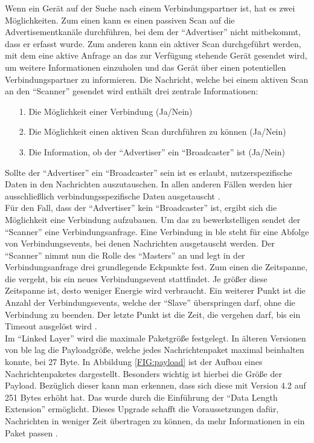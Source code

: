 \noindent Wenn ein Gerät auf der Suche nach einem Verbindungspartner ist, hat es zwei Möglichkeiten. Zum einen kann es einen passiven Scan auf die Advertisementkanäle durchführen, bei dem der "`Advertiser"' nicht mitbekommt, dass er erfasst wurde. Zum anderen kann ein aktiver Scan durchgeführt werden, mit dem eine aktive Anfrage an das zur Verfügung stehende Gerät gesendet wird, um weitere Informationen einzuholen und das Gerät über einen potentiellen Verbindungspartner zu informieren. Die Nachricht, welche bei einem aktiven Scan an den "`Scanner"' gesendet wird enthält drei zentrale Informationen:
\begin{itemize}
	\item[1.]{Die Möglichkeit einer Verbindung (Ja/Nein)}
	\item[2.]{Die Möglichkeit einen aktiven Scan durchführen zu können (Ja/Nein)}
	\item[3.]{Die Information, ob der "`Advertiser"' ein "`Broadcaster"' ist (Ja/Nein)}
\end{itemize}           
Sollte der "`Advertiser"' ein "`Broadcaster"' sein ist es erlaubt, nutzerspezifische Daten in den Nachrichten auszutauschen. In allen anderen Fällen werden hier ausschließlich verbindungsspezifische Daten ausgetauscht \cite[Seite 20f]{Townsend14:GSB}.\\

\noindent Für den Fall, dass der "`Advertiser"' kein "`Broadcaster"' ist, ergibt sich die Möglichkeit eine Verbindung aufzubauen. Um das zu bewerkstelligen sendet der "`Scanner"' eine Verbindungsanfrage. Eine Verbindung in \ac{ble} steht für eine Abfolge von Verbindungsevents, bei denen Nachrichten ausgetauscht werden. Der "`Scanner"' nimmt nun die Rolle des "`Masters"' an und legt in der Verbindungsanfrage drei grundlegende Eckpunkte fest. Zum einen die Zeitspanne, die vergeht, bis ein neues Verbindungsevent stattfindet. Je größer diese Zeitspanne ist, desto weniger Energie wird verbraucht. Ein weiterer Punkt ist die Anzahl der Verbindungsevents, welche der "`Slave"' überspringen darf, ohne die Verbindung zu beenden. Der letzte Punkt ist die Zeit, die vergehen darf, bis ein Timeout ausgelöst wird \cite[Seite 21f]{Townsend14:GSB}.\\ 

\noindent Im "`Linked Layer"' wird die maximale Paketgröße festgelegt. In älteren Versionen von \ac{ble} lag die Payloadgröße, welche jedes Nachrichtenpaket maximal beinhalten konnte, bei 27 Byte. In Abbildung \ref{FIG:payload} ist der Aufbau eines Nachrichtenpaketes dargestellt. Besonders wichtig ist hierbei die Größe der Payload. Bezüglich dieser kann man erkennen, dass sich diese mit Version 4.2 auf 251 Bytes erhöht hat. Das wurde durch die Einführung der "`Data Length Extension"' ermöglicht. Dieses Upgrade schafft die Voraussetzungen dafür, Nachrichten in weniger Zeit übertragen zu können, da mehr Informationen in ein Paket passen \cite{Gupta:WWW}.\\   

